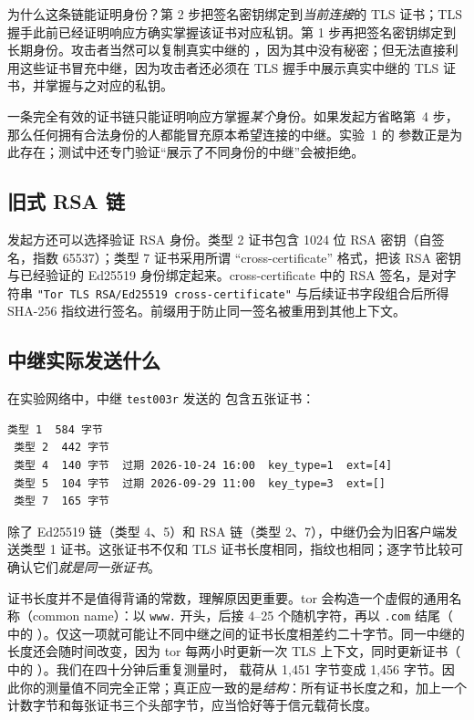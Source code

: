为什么这条链能证明身份？第 2 步把签名密钥绑定到\emph{当前连接}的 TLS 证书；TLS 握手此前已经证明响应方确实掌握该证书对应私钥。第 1 步再把签名密钥绑定到长期身份。攻击者当然可以复制真实中继的 ，因为其中没有秘密；但无法直接利用这些证书冒充中继，因为攻击者还必须在 TLS 握手中展示真实中继的 TLS 证书，并掌握与之对应的私钥。

\begin{attenzione}[必须检查预期身份]
一条完全有效的证书链只能证明响应方掌握\emph{某个}身份。如果发起方省略第~4 步，那么任何拥有合法身份的人都能冒充原本希望连接的中继。实验~1 的  参数正是为此存在；测试中还专门验证“展示了不同身份的中继”会被拒绝。
\end{attenzione}

\subsection{旧式 RSA 链}

发起方还可以选择验证 RSA 身份。类型 2 证书包含 1024 位 RSA 密钥（自签名，指数 65537）；类型 7 证书采用所谓 \enquote{cross-certificate} 格式，把该 RSA 密钥与已经验证的 Ed25519 身份绑定起来。cross-certificate 中的 RSA 签名，是对字符串 \texttt{"Tor TLS RSA/Ed25519 cross-certificate"} 与后续证书字段组合后所得 SHA-256 指纹进行签名。前缀用于防止同一签名被重用到其他上下文。

\subsection{中继实际发送什么}

在实验网络中，中继 \texttt{test003r} 发送的  包含五张证书：

\begin{lstlisting}[numbers=none]
 类型 1  584 字节
 类型 2  442 字节
 类型 4  140 字节  过期 2026-10-24 16:00  key_type=1  ext=[4]
 类型 5  104 字节  过期 2026-09-29 11:00  key_type=3  ext=[]
 类型 7  165 字节
\end{lstlisting}

除了 Ed25519 链（类型 4、5）和 RSA 链（类型 2、7），中继仍会为旧客户端发送类型 1 证书。这张证书不仅和 TLS 证书长度相同，指纹也相同；逐字节比较可确认它们\emph{就是同一张证书}。

证书长度并不是值得背诵的常数，理解原因更重要。tor 会构造一个虚假的通用名称（common name）：以 \texttt{www.} 开头，后接 4--25 个随机字符，再以 \texttt{.com} 结尾（ 中的 ）。仅这一项就可能让不同中继之间的证书长度相差约二十字节。同一中继的长度还会随时间改变，因为 tor 每两小时更新一次 TLS 上下文，同时更新证书（ 中的 ）。我们在四十分钟后重复测量时， 载荷从 1,451 字节变成 1,456 字节。因此你的测量值不同完全正常；真正应一致的是\emph{结构}：所有证书长度之和，加上一个计数字节和每张证书三个头部字节，应当恰好等于信元载荷长度。

